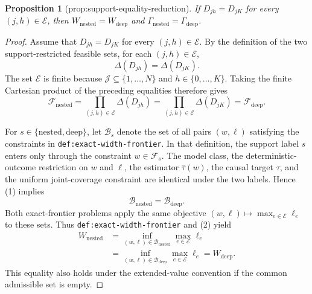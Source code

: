 \documentclass{article}
\newtheorem{proposition}{Proposition}
\begin{document}
\begin{proposition}[prop:support-equality-reduction]\label{prop:support-equality-reduction}
If \(D_{jh}=D_{jK}\) for every \((j,h)\in\mathcal E\), then \(W_{\mathrm{nested}}=W_{\mathrm{deep}}\) and \(\Gamma_{\mathrm{nested}}=\Gamma_{\mathrm{deep}}\).
\end{proposition}
\begin{proof}
Assume that \(D_{jh}=D_{jK}\) for every \((j,h)\in\mathcal E\).  By the definition of the two support-restricted feasible sets, for each \((j,h)\in\mathcal E\),
\[
 \Delta(D_{jh})=\Delta(D_{jK}).
\]
The set \(\mathcal E\) is finite because \(\mathcal J\subseteq\{1,\ldots,N\}\) and \(h\in\{0,\ldots,K\}\).  Taking the finite Cartesian product of the preceding equalities therefore gives
\[
 \mathcal F_{\mathrm{nested}}
 =\prod_{(j,h)\in\mathcal E}\Delta(D_{jh})
 =\prod_{(j,h)\in\mathcal E}\Delta(D_{jK})
 =\mathcal F_{\mathrm{deep}}.
 \tag{1}
\]

For \(s\in\{\mathrm{nested},\mathrm{deep}\}\), let \(\mathcal B_s\) denote the set of all pairs \((w,\ell)\) satisfying the constraints in \texttt{def:exact-width-frontier}.  In that definition, the support label \(s\) enters only through the constraint \(w\in\mathcal F_s\).  The model class, the deterministic-outcome restriction on \(w\) and \(\ell\), the estimator \(\widehat\tau(w)\), the causal target \(\tau\), and the uniform joint-coverage constraint are identical under the two labels.  Hence (1) implies
\[
 \mathcal B_{\mathrm{nested}}=\mathcal B_{\mathrm{deep}}.
 \tag{2}
\]
Both exact-frontier problems apply the same objective \((w,\ell)\mapsto\max_{e\in\mathcal E}\ell_e\) to these sets.  Thus \texttt{def:exact-width-frontier} and (2) yield
\[
 \begin{aligned}
 W_{\mathrm{nested}}
 &=\inf_{(w,\ell)\in\mathcal B_{\mathrm{nested}}}
     \max_{e\in\mathcal E}\ell_e\\
 &=\inf_{(w,\ell)\in\mathcal B_{\mathrm{deep}}}
     \max_{e\in\mathcal E}\ell_e
 =W_{\mathrm{deep}}.
 \end{aligned}
 \tag{3}
\]
This equality also holds under the extended-value convention if the common admissible set is empty.


\end{proof}
\end{document}
